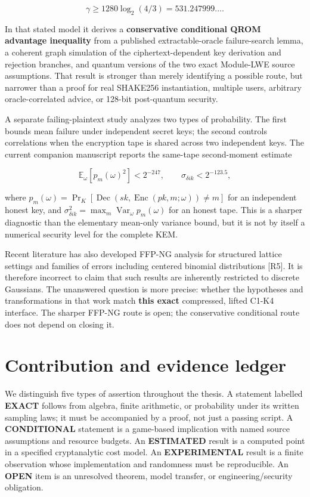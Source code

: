\documentclass[
  11pt,
  a4paper,
  oneside]{report}
\begin{document}
\[
\gamma\ge1280\log_2(4/3)=531.247999\ldots.
\]

In that stated model it derives a \textbf{conservative conditional QROM
advantage inequality} from a published extractable-oracle failure-search
lemma, a coherent graph simulation of the ciphertext-dependent key
derivation and rejection branches, and quantum versions of the two exact
Module-LWE source assumptions. That result is stronger than merely
identifying a possible route, but narrower than a proof for real
SHAKE256 instantiation, multiple users, arbitrary oracle-correlated
advice, or 128-bit post-quantum security.

A separate failing-plaintext study analyzes two types of probability.
The first bounds mean failure under independent secret keys; the second
controls correlations when the encryption tape is shared across two
independent keys. The current companion manuscript reports the same-tape
second-moment estimate

\[
\mathbb E_\omega[p_m(\omega)^2]<2^{-247},
\qquad \sigma_{\delta ik}<2^{-123.5},
\]

where
\(p_m(\omega)=\Pr_K[\operatorname{Dec}(sk,\operatorname{Enc}(pk,m;\omega))\ne m]\)
for an independent honest key, and
\(\sigma_{\delta ik}^2=\max_m\operatorname{Var}_{\omega} p_m(\omega)\)
for an honest tape. This is a sharper diagnostic than the elementary
mean-only variance bound, but it is not by itself a numerical security
level for the complete KEM.

Recent literature has also developed FFP-NG analysis for structured
lattice settings and families of errors including centered binomial
distributions {[}R5{]}. It is therefore incorrect to claim that such
results are inherently restricted to discrete Gaussians. The unanswered
question is more precise: whether the hypotheses and transformations in
that work match \textbf{this exact} compressed, lifted C1-K4 interface.
The sharper FFP-NG route is open; the conservative conditional route
does not depend on closing it.

\section{Contribution and evidence
ledger}\label{contribution-and-evidence-ledger}

We distinguish five types of assertion throughout the thesis. A
statement labelled \textbf{EXACT} follows from algebra, finite
arithmetic, or probability under its written sampling laws; it must be
accompanied by a proof, not just a passing script. A
\textbf{CONDITIONAL} statement is a game-based implication with named
source assumptions and resource budgets. An \textbf{ESTIMATED} result is
a computed point in a specified cryptanalytic cost model. An
\textbf{EXPERIMENTAL} result is a finite observation whose
implementation and randomness must be reproducible. An \textbf{OPEN}
item is an unresolved theorem, model transfer, or engineering/security
obligation.
\end{document}
